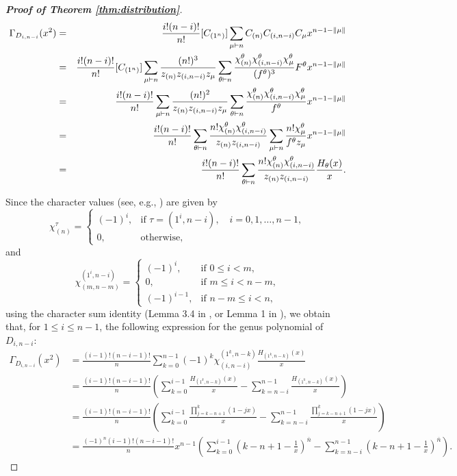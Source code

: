\documentclass[12pt]{article}
\theoremstyle{definition}
\def\dsum{\displaystyle\sum}
\begin{document}
\begin{proof}[\bf{Proof of Theorem \ref{thm:distribution}}]
\begin{eqnarray*}\Gamma_{D_{i,n-i}}(x^2)&=&\frac{i!(n-i)!}{n!}[C_{(1^n)}]\dsum_{\mu\vdash n}C_{(n)}C_{(i,n-i)}C_{\mu}x^{n-1-\parallel\mu\parallel}\notag \\
&=&\frac{i!(n-i)!}{n!}[C_{(1^n)}]\dsum_{\mu\vdash n}\frac{(n!)^3}{z_{(n)}z_{(i,n-i)}z_{\mu}}\dsum_{\theta\vdash n}\frac{\chi_{(n)}^{\theta}\chi_{(i,n-i)}^{\theta}\chi_{\mu}^{\theta}}{(f^{\theta})^3}F^{\theta}x^{n-1-\parallel\mu\parallel}\notag\\
&=&\frac{i!(n-i)!}{n!}\dsum_{\mu\vdash n}\frac{(n!)^2}{z_{(n)}z_{(i,n-i)}z_{\mu}}\dsum_{\theta\vdash n}\frac{\chi_{(n)}^{\theta}\chi_{(i,n-i)}^{\theta}\chi_{\mu}^{\theta}}{f^{\theta}}x^{n-1-\parallel\mu\parallel}\notag\\
&=&\frac{i!(n-i)!}{n!}\dsum_{\theta\vdash n}\frac{n!\chi_{(n)}^{\theta}\chi_{(i,n-i)}^{\theta}}{z_{(n)}z_{(i,n-i)}}\dsum_{\mu\vdash n}\frac{n!\chi_{\mu}^{\theta}}{f^{\theta}z_{\mu}}x^{n-1-\parallel\mu\parallel}\notag\\
&=&\frac{i!(n-i)!}{n!}\dsum_{\theta\vdash n}\frac{n!\chi_{(n)}^{\theta}\chi_{(i,n-i)}^{\theta}}{z_{(n)}z_{(i,n-i)}}\frac{H_{\theta}(x)}{x}.
\end{eqnarray*}

Since the character values  (see, e.g., \cite{Ja87}) are given by
\[
\chi_{(n)}^\tau =
\begin{cases}
(-1)^i, & \text{if } \tau=(1^i,n-i),\quad i=0,1,\dots,n-1,\\[2pt]
0, & \text{otherwise},
\end{cases}
\]
and
\[
\chi_{(m,n-m)}^{(1^i,n-i)} =
\begin{cases}
(-1)^i, & \text{if } 0\le i < m,\\[2pt]
0, & \text{if } m\le i < n-m,\\[2pt]
(-1)^{i-1}, & \text{if } n-m\le i < n,
\end{cases}
\]
using the character sum identity (Lemma 3.4 in \cite{JV90}, or Lemma 1 in \cite{Fang14}),
we obtain that, for \(1\le i\le n-1\), the following expression for the genus polynomial of \(D_{i,n-i}\):
\[
\begin{aligned}
\Gamma_{D_{i,n-i}}(x^2)
&= \frac{(i-1)!(n-i-1)!}{n}
\sum_{k=0}^{n-1} (-1)^k \chi_{(i,n-i)}^{(1^k,n-k)}
\frac{H_{(1^k,n-k)}(x)}{x} \nonumber \\
&= \frac{(i-1)!(n-i-1)!}{n}
\left(
\sum_{k=0}^{i-1} \frac{H_{(1^k,n-k)}(x)}{x}
-
\sum_{k=n-i}^{n-1} \frac{H_{(1^k,n-k)}(x)}{x}
\right) \\
&= \frac{(i-1)!(n-i-1)!}{n}
\left(
\sum_{k=0}^{i-1}
\frac{\prod_{j=k-n+1}^{k}(1-jx)}{x}
-
\sum_{k=n-i}^{n-1}
\frac{\prod_{j=k-n+1}^{k}(1-jx)}{x}
\right) \\
&= \frac{(-1)^n (i-1)!(n-i-1)!}{n} x^{n-1}
\left(
\sum_{k=0}^{i-1}
\left(k-n+1-\frac1x\right)^{\overline{n}}
-
\sum_{k=n-i}^{n-1}
\left(k-n+1-\frac1x\right)^{\overline{n}}
\right).
\end{aligned}
\]


\end{proof}
\end{document}
